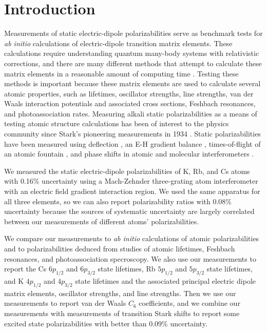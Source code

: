 \documentclass[twocolumn,pra,showpacs,superscriptaddress,longbibliography]{revtex4-1}   %
\begin{document}



\maketitle



\section{Introduction} \label{sectionIntroduction}

Measurements of static electric-dipole polarizabilities serve as benchmark tests for \textit{ab initio} calculations of electric-dipole transition matrix elements. 
These calculations require understanding quantum many-body systems with relativistic corrections, and there are many different methods that attempt to calculate these matrix elements in a reasonable amount of computing time \cite{Mitroy2010}. Testing these methods is important because these matrix elements are used to calculate several atomic properties, such as lifetimes, oscillator strengths, line strengths, van der Waals interaction potentials and associated cross sections, Feshbach resonances, and photoassociation rates.
Measuring alkali static polarizabilities as a means of testing atomic 
structure calculations has been of interest to the physics community since
Stark's pioneering measurements in 1934 \cite{Scheffers1934}. Static polarizabilities have been measured using deflection \cite{Scheffers1934,Chamberlain1963,Hall1974,Ma2015}, an E-H gradient
balance \cite{Salop1961,Molof1974a}, times-of-flight of an atomic fountain \cite{Amini2003}, and phase shifts in atomic and molecular interferometers
\cite{Ekstrom1995,Miffre2006,Holmgren2010,Berninger2007}.

We measured the static electric-dipole polarizabilities of K, Rb, and Cs atoms with 0.16\% uncertainty using a Mach-Zehnder three-grating atom interferometer \cite{Berman1997,Cronin2009} with an electric field gradient interaction region. We used the same apparatus for all three elements, so we can also report polarizability ratios with 0.08\% uncertainty because the sources of systematic uncertainty are largely correlated between our measurements of different atoms' polarizabilities. 

We compare our measurements to
\textit{ab initio} calculations of atomic polarizabilities and to polarizabilities deduced from studies of atomic lifetimes, Feshbach resonances, and photoassociation specroscopy. We also use our measurements to report the Cs $6p_{1/2}$ and $6p_{3/2}$ state lifetimes, Rb $5p_{1/2}$ and $5p_{3/2}$ state lifetimes, and K $4p_{1/2}$ and $4p_{3/2}$ state lifetimes and the associated principal electric dipole matrix elements, oscillator strengths, and line strengths. 
Then we use our measurements to report van der Waals $C_6$ coefficients,
and we combine our measurements with measurements of 
transition Stark shifts to report some excited state polarizabilities with better than 0.09\% uncertainty.
\end{document}

